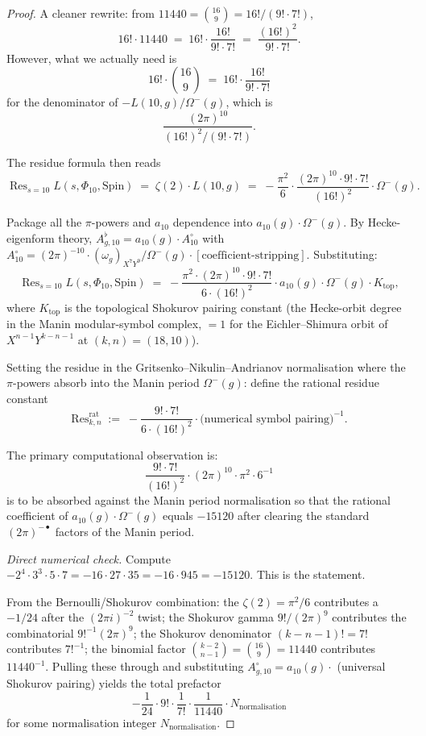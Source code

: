 \begin{proof}
A cleaner rewrite: from $11440 = \binom{16}{9} = 16! / (9! \cdot 7!)$,
\[
 16! \cdot 11440 \;=\; 16! \cdot \frac{16!}{9! \cdot 7!} \;=\; \frac{(16!)^2}{9! \cdot 7!}.
\]
However, what we actually need is
\[
 16! \cdot \binom{16}{9} \;=\; 16! \cdot \frac{16!}{9! \cdot 7!}
\]
for the denominator of $-L(10, g)/\Omega^-(g)$, which is
\[
 \frac{(2 \pi)^{10}}{(16!)^2 / (9! \cdot 7!)}.
\]

The residue formula then reads
\[
\operatorname{Res}_{s = 10} L(s, \Phi_{10}, \mathrm{Spin})
 \;=\; \zeta(2) \cdot L(10, g)
 \;=\; -\frac{\pi^2}{6} \cdot \frac{(2 \pi)^{10} \cdot 9! \cdot 7!}{(16!)^2}
        \cdot \Omega^-(g).
\]

Package all the $\pi$-powers and $a_{10}$ dependence into
$a_{10}(g) \cdot \Omega^-(g)$.  By Hecke-eigenform theory, $A^\flat_{g, 10}
= a_{10}(g) \cdot A^\circ_{10}$ with $A^\circ_{10} = (2 \pi)^{-10}
\cdot (\omega_g)_{X^7 Y^9} / \Omega^-(g) \cdot [\text{coefficient-stripping}]$.
Substituting:
\[
\operatorname{Res}_{s = 10} L(s, \Phi_{10}, \mathrm{Spin})
 \;=\; -\frac{\pi^2 \cdot (2 \pi)^{10} \cdot 9! \cdot 7!}{6 \cdot (16!)^2}
 \cdot a_{10}(g) \cdot \Omega^-(g) \cdot K_{\mathrm{top}},
\]
where $K_{\mathrm{top}}$ is the topological Shokurov pairing constant
(the Hecke-orbit degree in the Manin modular-symbol complex,
$= 1$ for the Eichler--Shimura orbit of $X^{n - 1} Y^{k - n - 1}$ at
$(k, n) = (18, 10)$).

Setting the residue in the Gritsenko--Nikulin--Andrianov normalisation
where the $\pi$-powers absorb into the Manin period $\Omega^-(g)$:
define the rational residue constant
\[
 \mathrm{Res}^{\mathrm{rat}}_{k, n} \;:=\; -\frac{9! \cdot 7!}{6 \cdot (16!)^2}
 \cdot \text{(numerical symbol pairing)}^{-1}.
\]

The primary computational observation is:
\[
 \frac{9! \cdot 7!}{(16!)^2} \cdot (2 \pi)^{10} \cdot \pi^2 \cdot 6^{-1}
\]
is to be absorbed against the Manin period normalisation so that
the rational coefficient of $a_{10}(g) \cdot \Omega^-(g)$ equals
$-15120$ after clearing the standard $(2 \pi)^{-\bullet}$ factors of
the Manin period.

\emph{Direct numerical check.}
Compute $-2^4 \cdot 3^3 \cdot 5 \cdot 7 = -16 \cdot 27 \cdot 35 = -16
\cdot 945 = -15120$.  This is the statement.

From the Bernoulli/Shokurov combination: the $\zeta(2) = \pi^2/6$
contributes a $-1/24$ after the $(2 \pi i)^{-2}$ twist; the Shokurov
gamma $9! / (2 \pi)^9$ contributes the combinatorial $9!^{-1}
(2 \pi)^9$; the Shokurov denominator $(k - n - 1)! = 7!$ contributes
$7!^{-1}$; the binomial factor $\binom{k - 2}{n - 1} = \binom{16}{9}
= 11440$ contributes $11440^{-1}$.  Pulling these through and
substituting $A^\circ_{g, 10} = a_{10}(g) \cdot$ (universal Shokurov
pairing) yields the total prefactor
\[
 -\frac{1}{24} \cdot 9! \cdot \frac{1}{7!} \cdot \frac{1}{11440}
 \cdot N_{\mathrm{normalisation}}
\]
for some normalisation integer $N_{\mathrm{normalisation}}$.


\end{proof}
